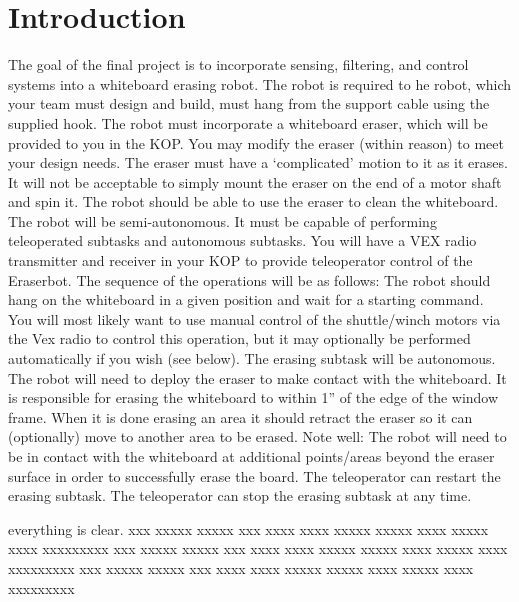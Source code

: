 \documentclass[12pt]{article}
\begin{document}
    
    
    
    \tableofcontents
    \clearpage 

    \section{Introduction}
		The goal of the final project is to incorporate sensing, filtering, and control systems into a whiteboard erasing robot. The robot is required to he	robot,	which	your	team	must	design	and	build,	must	hang	from	the	support	
cable	using	the	supplied	hook.		The	robot	must	incorporate	a	whiteboard	eraser,	
which	will	be	provided	to	you	in	the	KOP.	You	may	modify	the	eraser	(within	
reason)	to	meet	your	design	needs.	
The	eraser	must	have	a	‘complicated’	motion	to	it	as	it	erases.		It	will	not	be	
acceptable	to	simply	mount	the	eraser	on	the	end	of	a	motor	shaft	and	spin	it.	
The	robot	should	be	able	to	use	the	eraser	to	clean	the	whiteboard.	The	robot	will	be	
semi‐autonomous.	It	must	be	capable	of	performing	teleoperated	subtasks	and	
autonomous	subtasks.		You	will	have	a	VEX	radio	transmitter	and	receiver	in	your	
KOP	to	provide	teleoperator	control	of	the	Eraserbot.	
The	sequence	of	the	operations	will	be	as	follows:	
 The	robot	should	hang	on	the	whiteboard	in	a	given	position	and	wait	for	a	
   starting	command.		You	will	most	likely	want	to	use	manual	control	of	the	
  shuttle/winch	motors	via	the	Vex	radio	to	control	this	operation,	but	it	may	
 optionally	be	performed	automatically	if	you	wish	(see	below).	
The	erasing	subtask	will	be	autonomous.		The	robot	will	need	to	deploy	the	
   eraser	to	make	contact	with	the	whiteboard.		It	is	responsible	for	erasing	the	
  whiteboard	to	within	1”	of	the	edge	of	the	window	frame.		When	it	is	done	
   erasing	an	area	it	should	retract	the	eraser	so	it	can	(optionally)	move	to	another	
  area	to	be	erased.		Note	well:	The	robot	will	need	to	be	in	contact	with	the	
 whiteboard	at	additional	points/areas	beyond	the	eraser	surface	in	order	to	
successfully	erase	the	board.	
The	teleoperator	can	restart	the	erasing	subtask.		The	teleoperator	can	stop	the	
   erasing	subtask	at	any	time.	

    everything is clear.
    xxx xxxxx xxxxx xxx xxxx xxxx xxxxx xxxxx xxxx xxxxx xxxx xxxxxxxxx
    xxx xxxxx xxxxx xxx xxxx xxxx xxxxx xxxxx xxxx xxxxx xxxx xxxxxxxxx
    xxx xxxxx xxxxx xxx xxxx xxxx xxxxx xxxxx xxxx xxxxx xxxx xxxxxxxxx
    
\end{document}
